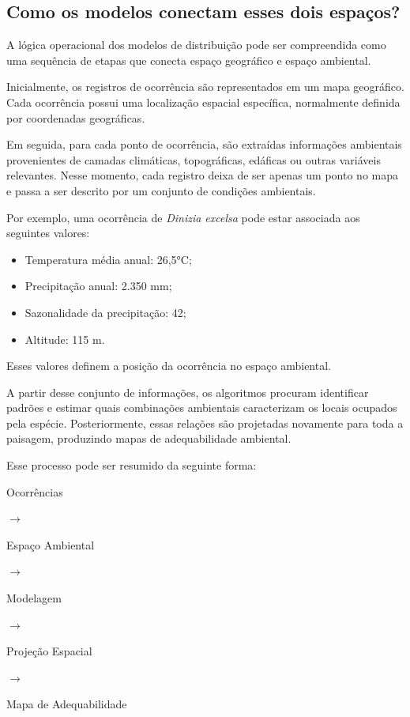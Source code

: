 \subsection{Como os modelos conectam esses dois espaços?}

A lógica operacional dos modelos de distribuição pode ser compreendida como uma sequência de etapas que conecta espaço geográfico e espaço ambiental.

Inicialmente, os registros de ocorrência são representados em um mapa geográfico. Cada ocorrência possui uma localização espacial específica, normalmente definida por coordenadas geográficas.

Em seguida, para cada ponto de ocorrência, são extraídas informações ambientais provenientes de camadas climáticas, topográficas, edáficas ou outras variáveis relevantes. Nesse momento, cada registro deixa de ser apenas um ponto no mapa e passa a ser descrito por um conjunto de condições ambientais.

Por exemplo, uma ocorrência de \textit{Dinizia excelsa} pode estar associada aos seguintes valores:

\begin{itemize}
	
	\item Temperatura média anual: 26,5°C;
	
	\item Precipitação anual: 2.350 mm;
	
	\item Sazonalidade da precipitação: 42;
	
	\item Altitude: 115 m.
	
\end{itemize}

Esses valores definem a posição da ocorrência no espaço ambiental.

A partir desse conjunto de informações, os algoritmos procuram identificar padrões e estimar quais combinações ambientais caracterizam os locais ocupados pela espécie. Posteriormente, essas relações são projetadas novamente para toda a paisagem, produzindo mapas de adequabilidade ambiental.

Esse processo pode ser resumido da seguinte forma:

\begin{center}
	
	Ocorrências
	
	$\rightarrow$
	
	Espaço Ambiental
	
	$\rightarrow$
	
	Modelagem
	
	$\rightarrow$
	
	Projeção Espacial
	
	$\rightarrow$
	
	Mapa de Adequabilidade
	
\end{center}


